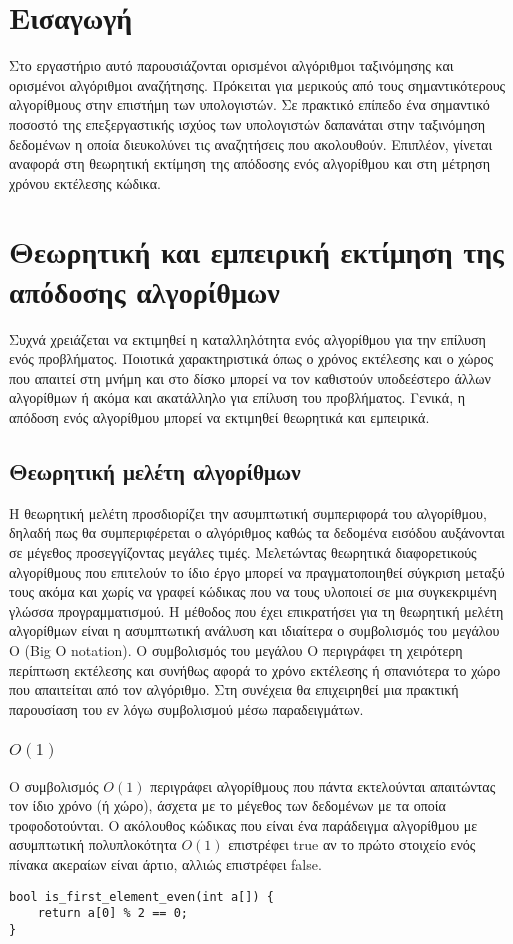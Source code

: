 \section{Εισαγωγή}
Στο εργαστήριο αυτό παρουσιάζονται ορισμένοι αλγόριθμοι ταξινόμησης και ορισμένοι αλγόριθμοι αναζήτησης. Πρόκειται για μερικούς από τους σημαντικότερους αλγορίθμους στην επιστήμη των υπολογιστών. Σε πρακτικό επίπεδο ένα σημαντικό ποσοστό της επεξεργαστικής ισχύος των υπολογιστών δαπανάται στην ταξινόμηση δεδομένων η οποία διευκολύνει τις αναζητήσεις που ακολουθούν. Επιπλέον, γίνεται αναφορά στη θεωρητική εκτίμηση της απόδοσης ενός αλγορίθμου και στη μέτρηση χρόνου εκτέλεσης κώδικα.

\section{Θεωρητική και εμπειρική εκτίμηση της απόδοσης αλγορίθμων}
Συχνά χρειάζεται να εκτιμηθεί η καταλληλότητα ενός αλγορίθμου για την επίλυση ενός προβλήματος. Ποιοτικά χαρακτηριστικά όπως ο χρόνος εκτέλεσης και ο χώρος που απαιτεί στη μνήμη και στο δίσκο μπορεί να τον καθιστούν υποδεέστερο άλλων αλγορίθμων ή ακόμα και ακατάλληλο για επίλυση του προβλήματος. Γενικά, η απόδοση ενός αλγορίθμου μπορεί να εκτιμηθεί θεωρητικά και εμπειρικά. 
\subsection{Θεωρητική μελέτη αλγορίθμων}
Η θεωρητική μελέτη προσδιορίζει την ασυμπτωτική συμπεριφορά του αλγορίθμου, δηλαδή πως θα συμπεριφέρεται ο αλγόριθμος καθώς τα δεδομένα εισόδου αυξάνονται σε μέγεθος προσεγγίζοντας μεγάλες τιμές. Μελετώντας θεωρητικά διαφορετικούς αλγορίθμους που επιτελούν το ίδιο έργο μπορεί να πραγματοποιηθεί σύγκριση μεταξύ τους ακόμα και χωρίς να γραφεί κώδικας που να τους υλοποιεί σε μια συγκεκριμένη γλώσσα προγραμματισμού. Η μέθοδος που έχει επικρατήσει για τη θεωρητική μελέτη αλγορίθμων είναι η ασυμπτωτική ανάλυση και ιδιαίτερα ο συμβολισμός του μεγάλου Ο (Big O notation). Ο συμβολισμός του μεγάλου Ο περιγράφει τη χειρότερη περίπτωση εκτέλεσης και συνήθως αφορά το χρόνο εκτέλεσης ή σπανιότερα το χώρο που απαιτείται από τον αλγόριθμο. Στη συνέχεια θα επιχειρηθεί μια πρακτική παρουσίαση του εν λόγω συμβολισμού μέσω παραδειγμάτων.
\subsubsection{$O(1)$}
Ο συμβολισμός $O(1)$ περιγράφει αλγορίθμους που πάντα εκτελούνται απαιτώντας τον ίδιο χρόνο (ή χώρο), άσχετα με το μέγεθος των δεδομένων με τα οποία τροφοδοτούνται. Ο ακόλουθος κώδικας που είναι ένα παράδειγμα αλγορίθμου με ασυμπτωτική πολυπλοκότητα $O(1)$ επιστρέφει true αν το πρώτο στοιχείο ενός πίνακα ακεραίων είναι άρτιο, αλλιώς επιστρέφει false.
\begin{lstlisting}
bool is_first_element_even(int a[]) { 
	return a[0] % 2 == 0; 
}
\end{lstlisting}

